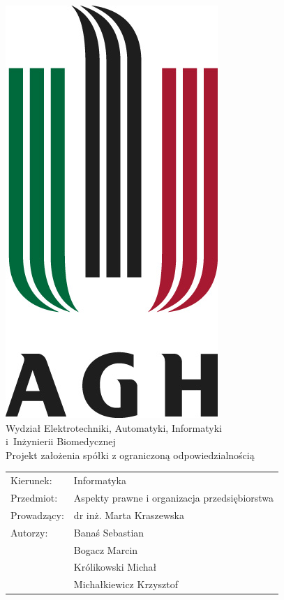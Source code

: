 \documentclass[a4paper,12pt,oneside]{article}
\begin{document}
	\begin{titlepage}
		\begin{center}
			\includegraphics[keepaspectratio]{agh.jpg}\\[0.5cm]
			{\large Wydział Elektrotechniki, Automatyki, Informatyki \\i~Inżynierii Biomedycznej}\\[0.5cm]
			{\huge Projekt założenia spółki z ograniczoną odpowiedzialnością}\\[1cm]
			\begin{table}[!h]
				\begin{tabular}{ll}
					Kierunek: & Informatyka \\
					Przedmiot: & Aspekty prawne i organizacja przedsiębiorstwa\\
					Prowadzący: & dr inż. Marta Kraszewska\\
					Autorzy: &Banaś Sebastian\\
					&Bogacz Marcin\\
					&Królikowski Michał\\
					&Michałkiewicz Krzysztof\\
				\end{tabular}
			\end{table}
		\end{center}
	\end{titlepage}
\end{document}
